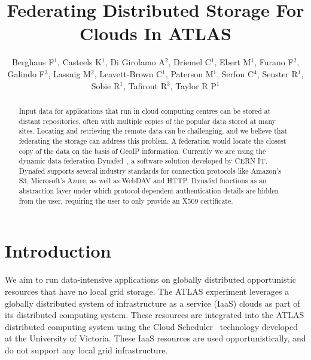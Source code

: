 \documentclass[a4paper]{jpconf}
\begin{document}
\title{Federating Distributed Storage For Clouds In ATLAS}


\author{Berghaus F$^1$, Casteels K$^1$, Di Girolamo A$^2$, Driemel C$^1$, Ebert M$^1$, Furano F$^2$, Galindo F$^3$, Lassnig M$^2$, Leavett-Brown C$^1$, Paterson M$^1$, Serfon C$^4$, Seuster R$^1$, Sobie R$^1$, Tafirout R$^3$, Taylor R P$^1$}
\address{$^1$ University of Victoria, Canada\\$^2$ CERN,  Switzerland\\$^3$ TRIUMF, Canada\\$^4$ University of Oslo, Norway}


\begin{abstract}
Input data for applications that run in cloud computing centres can be stored at distant repositories, often with multiple copies of the popular data stored at many sites. Locating and retrieving the remote data can be challenging, and we believe that federating the storage can address this problem. A federation would locate the closest copy of the data on the basis of GeoIP information. Currently we are using the dynamic data federation Dynafed~\cite{dynafed}, a software solution developed by CERN IT. Dynafed supports several industry standards for connection protocols like Amazon's S3, Microsoft's Azure, as well as WebDAV and HTTP. Dynafed functions as an abstraction layer under which protocol-dependent authentication details are  hidden from the user, requiring the user to only provide an X509 certificate.
\end{abstract}

\section{Introduction}
We aim to run data-intensive applications on globally distributed opportunistic resources that have no local grid storage. The ATLAS experiment leverages a globally distributed system of infrastructure as a service (IaaS) clouds as part of its distributed computing system. These resources are integrated into the ATLAS distributed computing system using the Cloud Scheduler~\cite{cloud-scheduler} technology developed at the University of Victoria. These IaaS resources are used opportunistically, and do not support any local grid infrastructure.
\end{document}
